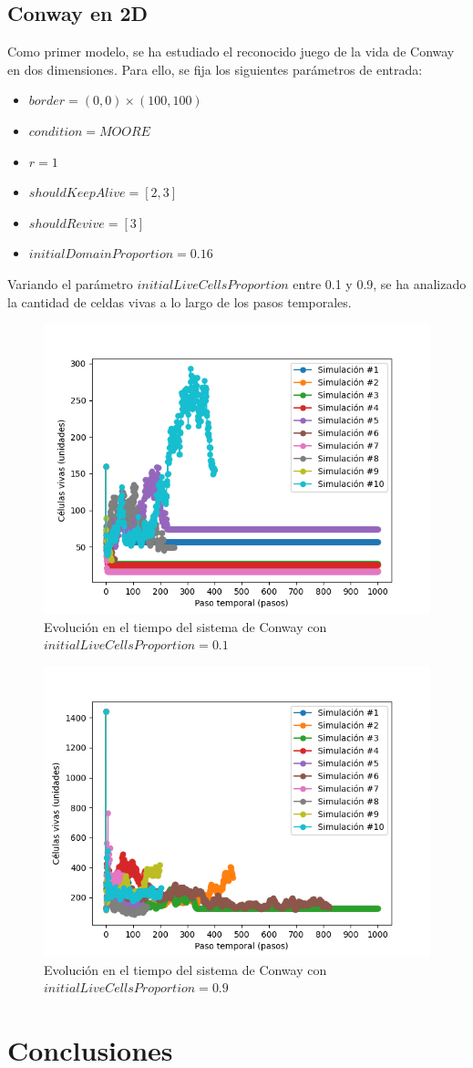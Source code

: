 \documentclass[11pt]{article}
\begin{document}
    \subsection{Conway en 2D}\label{subsec:conway-en-2d}

    Como primer modelo, se ha estudiado el reconocido juego de la vida de Conway en dos dimensiones.
    Para ello, se fija los siguientes parámetros de entrada:

    \begin{itemize}
        \item $border = (0, 0) \times (100, 100)$
        \item $condition = MOORE$
        \item $r = 1$
        \item $shouldKeepAlive = [2, 3]$
        \item $shouldRevive = [3]$
        \item $initialDomainProportion = 0.16$
    \end{itemize}
    Variando el parámetro $initialLiveCellsProportion$ entre 0.1 y 0.9, se ha analizado la cantidad de celdas vivas
    a lo largo de los pasos temporales.
    \begin{figure}[H]
        \centering
        \includegraphics[width=0.6\linewidth]{conway2d/size_i10}
        \caption{Evolución en el tiempo del sistema de Conway con $initialLiveCellsProportion = 0.1$}
        \label{fig:conway2d_i10}
    \end{figure}
    \begin{figure}[H]
        \centering
        \includegraphics[width=0.6\linewidth]{conway2d/size_i90}
        \caption{Evolución en el tiempo del sistema de Conway con $initialLiveCellsProportion = 0.9$}
        \label{fig:conway2d_i90}
    \end{figure}

    \section{Conclusiones}\label{sec:conclusiones}
\end{document}
